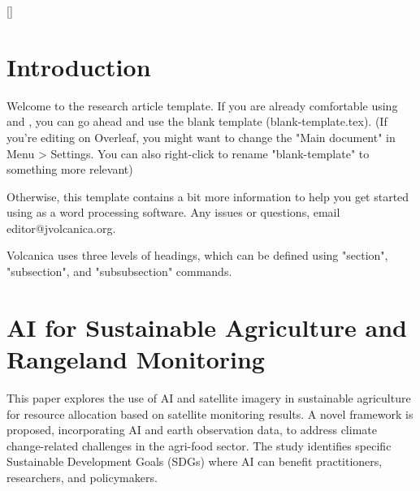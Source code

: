 \documentclass[draft, {\secondLanguage}, english]{volcanica-template}
\author[{{\affiliation{1}}}] 				%
{\orcidaffil{0000.0000.0000.0000}~			%
Paria Tahan	 				%
\Email{paria.tahan@studenti.unipd.it}} 		        	%
\author[{{\affiliation{2}}}] 				%
{\orcidaffil{0000.0000.0000.0000}~			%
Andrea Maci 			
\Email{andrea.maci@studenti.unipd.it}} 		%
\affil[{{\affiliation{1}}}]{					%
2043889 paria.tahan@studenti.unipd.it; Department of Computer Engineering.
}
\affil[{{\affiliation{2}}}]{					%
2063146 andrea.maci@studenti.unipd.it; Department of Computer Engineering.
}
\begin{document}
\FrontMatter{\protect{\lipsum[45]}}
[]%
{					
}

\hypertarget{introduction}{%
\section{Introduction}\label{introduction}}		%

Welcome to the \VOLCANICA research article \latex template. If you are already comfortable using \latex and \bibtex, you can go ahead and use the blank template (blank-template.tex). (If you're editing on Overleaf, you might want to change the "Main document" in Menu > Settings. You can also right-click to rename "blank-template" to something more relevant)

Otherwise, this template contains a bit more information to help you get started using \latex as a word processing software. Any issues or questions, email editor@jvolcanica.org.

Volcanica uses three levels of headings, which can be defined using "section", "subsection", and "subsubsection" commands.

\section{AI for Sustainable Agriculture and Rangeland Monitoring}\label{sec:02}
This paper \parencite{Efremova2023} explores the use of AI and satellite imagery in sustainable agriculture for resource allocation based on satellite monitoring results. A novel framework is proposed, incorporating AI and earth observation data, to address climate change-related challenges in the agri-food sector. The study identifies specific Sustainable Development Goals (SDGs) where AI can benefit practitioners, researchers, and policymakers. 
\end{document}
